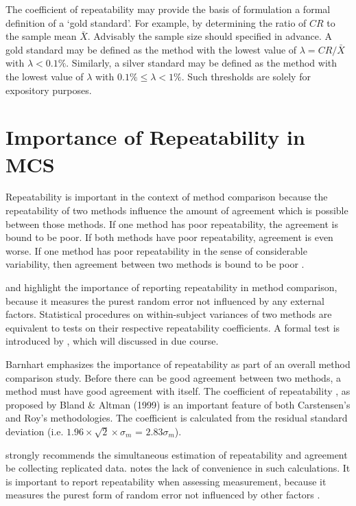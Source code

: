 \documentclass[12pt, a4paper]{report}
\theoremstyle{plain}
\theoremstyle{definition}
\theoremstyle{remark}
\begin{document}
		The coefficient of repeatability may provide the basis of formulation a formal definition of a `gold standard'. For example, by determining the ratio of $CR$ to the sample mean $\bar{X}$. Advisably the sample size should specified in advance. A gold standard may be defined as the method with the lowest value of $\lambda = CR /\bar{X}$ with $\lambda < 0.1\%$. Similarly, a silver standard may be defined as the method with the lowest value of $\lambda $ with $0.1\% \leq \lambda < 1\%$. Such thresholds are solely for expository purposes.
		

	\section{Importance of Repeatability in MCS}
	
		Repeatability is important in the context of method comparison because the repeatability of two methods influence the amount of agreement which is possible between those methods. If one method has poor repeatability, the agreement is bound to be poor. If both methods have poor repeatability, agreement is even worse. If one method has poor repeatability in the sense of considerable variability, then agreement between two methods is bound to be poor \citep{ARoy2009}.
		
		\citet{Barnhart} and \citet{roy} highlight the importance of reporting repeatability in method comparison, because it measures the purest random error not influenced by any external factors. Statistical procedures on within-subject variances of two methods are equivalent to tests on their respective repeatability coefficients. A formal test is introduced by \citet{roy}, which will discussed in due course.
		
	
	Barnhart emphasizes the importance of repeatability as part of an overall method comparison study. Before there can be good agreement between two methods, a method must have good agreement with itself. The coefficient of repeatability , as proposed by Bland \& Altman (1999) is an important feature of both Carstensen's and Roy's methodologies. The coefficient is calculated from the residual standard deviation (i.e. $1.96 \times \sqrt{2} \times \sigma_m$ = $2.83 \sigma_m$).
	
	
	\citet{BA99} strongly recommends the simultaneous estimation of repeatability and agreement be collecting replicated data. \citet{ARoy2009} notes the lack of convenience in such calculations.
	It is important to report repeatability when assessing measurement, because it measures the purest form of random error not influenced by other factors \citep{Barnhart}.	
	
\end{document}

